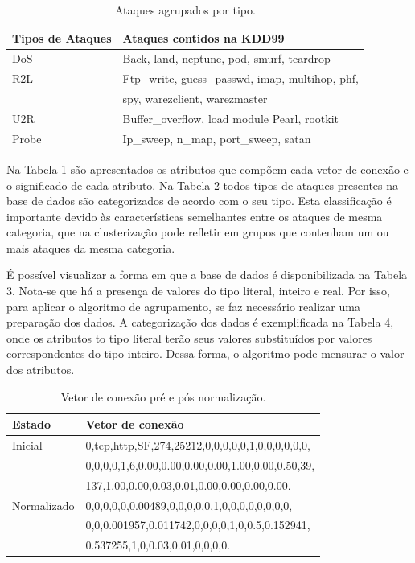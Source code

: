 \begin{table}[h]
\centering
\caption{Ataques agrupados por tipo.}
\vspace{0.5cm}
\begin{tabular}{|l|l|}
\hline
\textbf{Tipos de Ataques} & \textbf{Ataques contidos na KDD99}\\
\hline
DoS &	Back, land, neptune, pod, smurf, teardrop \\
\hline
R2L &	Ftp\_write, guess\_passwd, imap, multihop, phf,\\ & spy, warezclient, warezmaster \\
\hline
U2R &	Buffer\_overflow, load module Pearl, rootkit\\
\hline
Probe &	Ip\_sweep, n\_map, port\_sweep, satan\\
\hline
\end{tabular}
\end{table}

\indent Na Tabela 1 são apresentados os atributos que compõem cada vetor de conexão e o significado de cada atributo. Na Tabela 2 todos tipos de ataques presentes na base de dados são categorizados de acordo com o seu tipo. Esta classificação é importante devido às características semelhantes entre os ataques de mesma categoria, que na clusterização pode refletir em grupos que contenham um ou mais ataques da mesma categoria.

\indent É possível visualizar a forma em que a base de dados é disponibilizada na Tabela 3. Nota-se que há a presença de valores do tipo literal, inteiro e real. Por isso, para aplicar o algoritmo de agrupamento, se faz necessário realizar uma preparação dos dados. A categorização dos dados é exemplificada na Tabela 4, onde os atributos to tipo literal terão seus valores substituídos por valores correspondentes do tipo inteiro. Dessa forma, o algoritmo pode mensurar o valor dos atributos.

\begin{table}[h]
\centering
\caption{Vetor de conexão pré e pós normalização.}
\vspace{0.5cm}
\begin{tabular}{|l|l|}
\hline
\textbf{Estado} & \textbf{Vetor de conexão}\\
\hline
Inicial	 & 0,tcp,http,SF,274,25212,0,0,0,0,0,1,0,0,0,0,0,0,
	\\ & 0,0,0,0,1,6,0.00,0.00,0.00,0.00,1.00,0.00,0.50,39,
	\\ & 137,1.00,0.00,0.03,0.01,0.00,0.00,0.00,0.00.\\
\hline
Normalizado & 0,0,0,0,0,0.00489,0,0,0,0,0,1,0,0,0,0,0,0,0,0,
	   \\& 0,0,0.001957,0.011742,0,0,0,0,1,0,0.5,0.152941,
	   \\& 0.537255,1,0,0.03,0.01,0,0,0,0.\\
\hline

\end{tabular}
\end{table}



